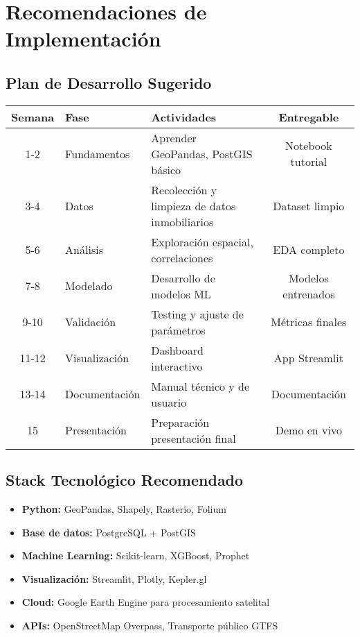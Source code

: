 \documentclass[12pt,a4paper]{article}
\begin{document}
\section{Recomendaciones de Implementación}

\subsection{Plan de Desarrollo Sugerido}

\begin{center}
\begin{tabular}{|c|l|p{6cm}|c|}
\hline
\textbf{Semana} & \textbf{Fase} & \textbf{Actividades} & \textbf{Entregable} \\
\hline
1-2 & Fundamentos & Aprender GeoPandas, PostGIS básico & Notebook tutorial \\
\hline
3-4 & Datos & Recolección y limpieza de datos inmobiliarios & Dataset limpio \\
\hline
5-6 & Análisis & Exploración espacial, correlaciones & EDA completo \\
\hline
7-8 & Modelado & Desarrollo de modelos ML & Modelos entrenados \\
\hline
9-10 & Validación & Testing y ajuste de parámetros & Métricas finales \\
\hline
11-12 & Visualización & Dashboard interactivo & App Streamlit \\
\hline
13-14 & Documentación & Manual técnico y de usuario & Documentación \\
\hline
15 & Presentación & Preparación presentación final & Demo en vivo \\
\hline
\end{tabular}
\end{center}

\subsection{Stack Tecnológico Recomendado}

\begin{tcolorbox}[colback=green!5!white,colframe=darkgreen,title=\textbf{TECNOLOGÍAS ESENCIALES}]
\begin{itemize}
    \item \textbf{Python:} GeoPandas, Shapely, Rasterio, Folium
    \item \textbf{Base de datos:} PostgreSQL + PostGIS
    \item \textbf{Machine Learning:} Scikit-learn, XGBoost, Prophet
    \item \textbf{Visualización:} Streamlit, Plotly, Kepler.gl
    \item \textbf{Cloud:} Google Earth Engine para procesamiento satelital
    \item \textbf{APIs:} OpenStreetMap Overpass, Transporte público GTFS
\end{itemize}
\end{tcolorbox}
\end{document}
